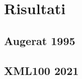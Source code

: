 \documentclass[compress]{beamer}
\begin{document}
\section{Risultati}

\subsection{Augerat 1995}
\begin{frame}{\subsecname}
\end{frame}

\subsection{XML100 2021}
\begin{frame}{\subsecname}
\end{frame}
\end{document}
